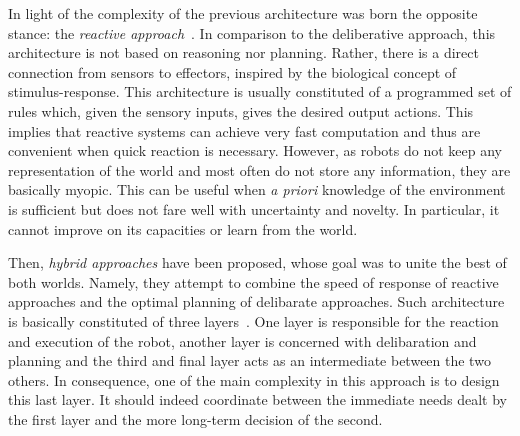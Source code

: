 
    In light of the complexity of the previous architecture was born the opposite stance: the \emph{reactive approach}~\parencite{Brooks1986}. In comparison to the deliberative approach, this architecture is not based on reasoning nor planning. Rather, there is a direct connection from sensors to effectors, inspired by the biological concept of stimulus-response. This architecture is usually constituted of a programmed set of rules which, given the sensory inputs, gives the desired output actions. This implies that reactive systems can achieve very fast computation and thus are convenient when quick reaction is necessary. However, as robots do not keep any representation of the world and most often do not store any information, they are basically myopic. This can be useful when \emph{a priori} knowledge of the environment is sufficient but does not fare well with uncertainty and novelty. In particular, it cannot improve on its capacities or learn from the world.

    Then, \emph{hybrid approaches} have been proposed, whose goal was to unite the best of both worlds. Namely, they attempt to combine the speed of response of reactive approaches and the optimal planning of delibarate approaches. Such architecture is basically constituted of three layers~\parencite{Mataric2008}. One layer is responsible for the reaction and execution of the robot, another layer is concerned with delibaration and planning and the third and final layer acts as an intermediate between the two others. In consequence, one of the main complexity in this approach is to design this last layer. It should indeed coordinate between the immediate needs dealt by the first layer and the more long-term decision of the second.

